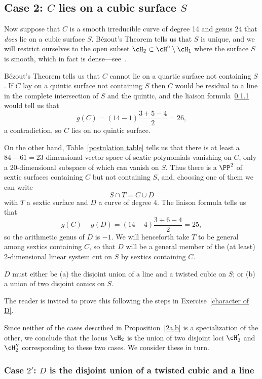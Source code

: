 \subsection{Case 2: $C$ lies on a cubic surface $S$}

Now suppose that $C$ is a smooth irreducible curve of degree 14 and genus 24 that \emph{does} lie on a cubic surface $S$. B\'ezout's Theorem tells us that  $S$  is unique, and we will restrict ourselves to the open subset $\cH_2 \subset \cH^\circ \setminus \cH_1$ where the surface $S$ is smooth, which in fact is dense---see~\cite{Nasu2008}.

B\'ezout's Theorem tells us that $C$ cannot lie on a quartic surface not containing $S$. If $C$ lay on a quintic surface not containing $S$ then $C$ would be residual to a line in the complete intersection of $S$ and the quintic, and the liaison formula~\ref{} would tell us that 
$$
g(C) = (14-1)\frac{3+5-4}{2} = 26,
$$
a contradiction, so $C$ lies on no quintic surface.

On the other hand, Table~\ref{postulation table} tells us that there is at least a $84-61 = 23$-dimensional vector space of sextic polynomials vanishing on  $C$, only a 20-dimensional subspace of which can vanish on $S$. Thus there is a $\PP^2$ of sextic surfaces containing $C$ but not containing $S$, and, choosing one of them we can write
$$
S \cap T = C \cup D
$$
with $T$ a sextic surface and $D$ a curve of degree 4. The liaison formula  tells us that
$$
g(C) - g(D) = (14 - 4)\frac{3+6-4}{2} = 25,
$$
so the arithmetic genus of $D$ is $-1$. We will henceforth take $T$ to be general among sextics containing $C$, so that $D$ will be a general member of the (at least) 2-dimensional linear system cut on $S$ by sextics containing $C$.

\begin{proposition}\label {2a,b}
$D$ must either be (a) the disjoint union of a line and a twisted cubic on $S$; or (b) a union of two disjoint conics on $S$. 
\end{proposition}

The reader is invited to prove this following the steps in Exercise~\ref{character of D}.

Since neither of the cases described in Proposition~\ref{2a,b} is a specialization of the other, we conclude that the locus $\cH_2$ is the union of two disjoint loci $\cH_{2}'$ and $\cH_{2}''$ corresponding to these two cases. We consider these in turn.


\subsubsection{Case $2'$: $D$ is the disjoint union of a twisted cubic and a line}

